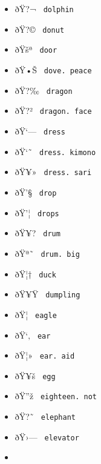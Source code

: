 \begin{itemize}
\item
  \label{symbol-dolphin}{{ ðŸ?¬ } \texttt{\ dolphin\ }}
\item
  \label{symbol-donut}{{ ðŸ?© } \texttt{\ donut\ }}
\item
  \label{symbol-door}{{ ðŸšª } \texttt{\ door\ }}
\item
  \label{symbol-dove.peace}{{ ðŸ•Š }
  \texttt{\ dove.\ peace\ }}
\item
  \label{symbol-dragon}{{ ðŸ?‰ } \texttt{\ dragon\ }}
\item
  \label{symbol-dragon.face}{{ ðŸ?² }
  \texttt{\ dragon.\ face\ }}
\item
  \label{symbol-dress}{{ ðŸ`--- } \texttt{\ dress\ }}
\item
  \label{symbol-dress.kimono}{{ ðŸ`˜ }
  \texttt{\ dress.\ kimono\ }}
\item
  \label{symbol-dress.sari}{{ ðŸ¥» }
  \texttt{\ dress.\ sari\ }}
\item
  \label{symbol-drop}{{ ðŸ'§ } \texttt{\ drop\ }}
\item
  \label{symbol-drops}{{ ðŸ'¦ } \texttt{\ drops\ }}
\item
  \label{symbol-drum}{{ ðŸ¥? } \texttt{\ drum\ }}
\item
  \label{symbol-drum.big}{{ ðŸª˜ }
  \texttt{\ drum.\ big\ }}
\item
  \label{symbol-duck}{{ ðŸ¦† } \texttt{\ duck\ }}
\item
  \label{symbol-dumpling}{{ ðŸ¥Ÿ } \texttt{\ dumpling\ }}
\item
  \label{symbol-eagle}{{ ðŸ¦ } \texttt{\ eagle\ }}
\item
  \label{symbol-ear}{{ ðŸ`‚ } \texttt{\ ear\ }}
\item
  \label{symbol-ear.aid}{{ ðŸ¦» } \texttt{\ ear.\ aid\ }}
\item
  \label{symbol-egg}{{ ðŸ¥š } \texttt{\ egg\ }}
\item
  \label{symbol-eighteen.not}{{ ðŸ''ž }
  \texttt{\ eighteen.\ not\ }}
\item
  \label{symbol-elephant}{{ ðŸ?˜ } \texttt{\ elephant\ }}
\item
  \label{symbol-elevator}{{ ðŸ›--- }
  \texttt{\ elevator\ }}
\item

\end{itemize}
